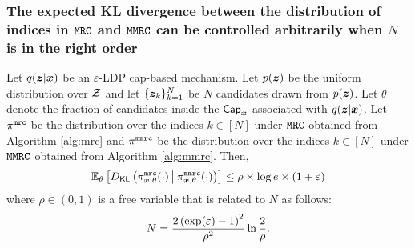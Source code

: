 \subsubsection{The expected KL divergence between the distribution of indices in \texorpdfstring{$\texttt{MRC}$}{MRC} and \texorpdfstring{$\texttt{MMRC}$}{MMRC} can be controlled arbitrarily when \texorpdfstring{$N$}{N} is in the right order} 
\begin{lemma}\label{lemma:expected_kl}
Let $q({\boldsymbol{z}}|{\boldsymbol{x}})$ be an $\varepsilon$-LDP cap-based mechanism. Let $p({\boldsymbol{z}})$ be the uniform distribution over $\mathcal{Z}$ and let $\{{\boldsymbol{z}}_k\}_{k=1}^{N}$ be $N$ candidates drawn from $p({\boldsymbol{z}})$. Let $\theta$ denote the fraction of candidates inside the $\mathsf{Cap}_{{\boldsymbol{x}}}$ associated with $q({\boldsymbol{z}}|{\boldsymbol{x}})$. Let $\pi^{\texttt{mrc}}$ be the distribution over the indices $k \in [N]$ under $\texttt{MRC}$ obtained from Algorithm \ref{alg:mrc} and $\pi^{\texttt{mmrc}}$ be the distribution over the indices $k \in [N]$ under $\texttt{MMRC}$ obtained from Algorithm \ref{alg:mmrc}. Then,
\begin{align}
    \mathbb{E}_{\theta}\left[{D}_{\mathsf{KL}}\left( \pi^{\texttt{mrc}}_{{\boldsymbol{x}}, \theta}(\cdot)\, \middle\Vert \pi^{\texttt{mmrc}}_{{\boldsymbol{x}}, \theta}(\cdot) \right)\right] \leq \rho \times \log e \times ( 1  +  \varepsilon)
\end{align}
where $\rho \in (0,1)$ is a free variable that is related to $N$ as follows:
\begin{align}
    N = \frac{2\left(\exp(\varepsilon)-1\right)^2}{\rho^2}  \ln\frac{2}{\rho}.  
\end{align}
\end{lemma}
